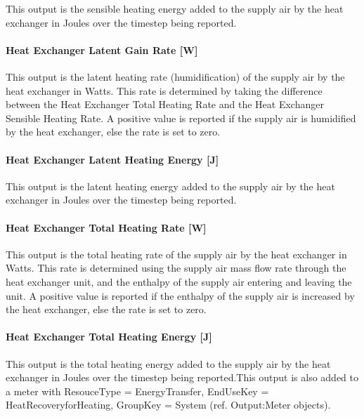 This output is the sensible heating energy added to the supply air by the heat exchanger in Joules over the timestep being reported.

\paragraph{Heat Exchanger Latent Gain Rate {[}W{]}}\label{heat-exchanger-latent-gain-rate-w}

This output is the latent heating rate (humidification) of the supply air by the heat exchanger in Watts. This rate is determined by taking the difference between the Heat Exchanger Total Heating Rate and the Heat Exchanger Sensible Heating Rate. A positive value is reported if the supply air is humidified by the heat exchanger, else the rate is set to zero.

\paragraph{Heat Exchanger Latent Heating Energy {[}J{]}}\label{heat-exchanger-latent-heating-energy-j}

This output is the latent heating energy added to the supply air by the heat exchanger in Joules over the timestep being reported.

\paragraph{Heat Exchanger Total Heating Rate {[}W{]}}\label{heat-exchanger-total-heating-rate-w}

This output is the total heating rate of the supply air by the heat exchanger in Watts. This rate is determined using the supply air mass flow rate through the heat exchanger unit, and the enthalpy of the supply air entering and leaving the unit. A positive value is reported if the enthalpy of the supply air is increased by the heat exchanger, else the rate is set to zero.

\paragraph{Heat Exchanger Total Heating Energy {[}J{]}}\label{heat-exchanger-total-heating-energy-j}

This output is the total heating energy added to the supply air by the heat exchanger in Joules over the timestep being reported.This output is also added to a meter with ResouceType = EnergyTransfer, EndUseKey = HeatRecoveryforHeating, GroupKey = System (ref. Output:Meter objects).

